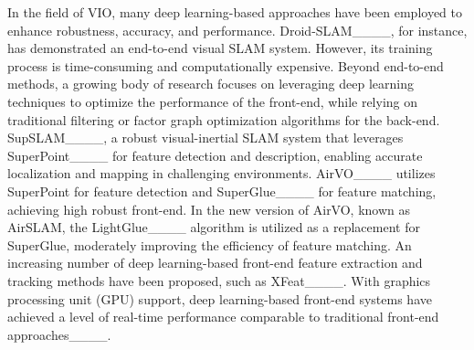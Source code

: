 In the field of VIO, many deep learning-based approaches have been employed to enhance robustness, accuracy, and performance. Droid-SLAM____, for instance, has demonstrated an end-to-end visual SLAM system. However, its training process is time-consuming and computationally expensive. Beyond end-to-end methods, a growing body of research focuses on leveraging deep learning techniques to optimize the performance of the front-end, while relying on traditional filtering or factor graph optimization algorithms for the back-end. SupSLAM____, a robust visual-inertial SLAM system that leverages SuperPoint____ for feature detection and description, enabling accurate localization and mapping in challenging environments. AirVO____ utilizes SuperPoint for feature detection and SuperGlue____ for feature matching, achieving high robust front-end. In the new version of AirVO, known as AirSLAM, the LightGlue____ algorithm is utilized as a replacement for SuperGlue, moderately improving the efficiency of feature matching. An increasing number of deep learning-based front-end feature extraction and tracking methods have been proposed, such as XFeat____. With graphics processing unit (GPU) support, deep learning-based front-end systems have achieved a level of real-time performance comparable to traditional front-end approaches____.%
